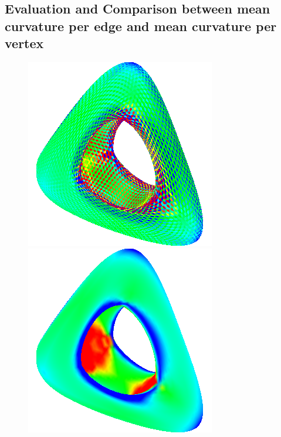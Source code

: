 \subsection{Evaluation and Comparison between mean curvature per edge and mean curvature per vertex}
\begin{figure}[!h]
    \centering
    \centering
    \includegraphics[scale=0.7]{images/genus-mce.png}
    \endminipage\hfill
    \centering
    \centering
    \includegraphics[scale=0.7]{images/genus-mcv.png}
    \endminipage\hfill
    \centering

\end{figure}
